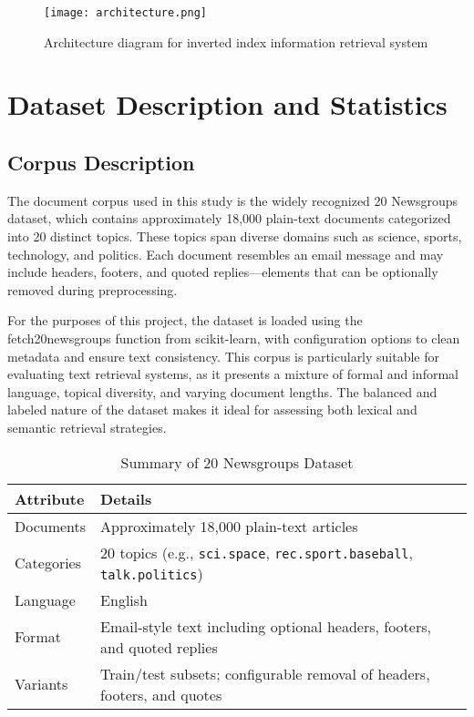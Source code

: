 \documentclass[conference]{IEEEtran}
\begin{document}
\begin{figure}[htbp]
    \centering
    \texttt{[image: architecture.png]} %
    \caption{Architecture diagram for inverted index information retrieval system}
    \label{fig:architecture}
\end{figure}


\section{Dataset Description and Statistics}\label{AA}
\subsection{Corpus Description}
The document corpus used in this study is the widely recognized 20 Newsgroups dataset, which contains approximately 18,000 plain-text documents categorized into 20 distinct topics. These topics span diverse domains such as science, sports, technology, and politics. Each document resembles an email message and may include headers, footers, and quoted replies—elements that can be optionally removed during preprocessing.

For the purposes of this project, the dataset is loaded using the fetch20newsgroups function from scikit-learn, with configuration options to clean metadata and ensure text consistency. This corpus is particularly suitable for evaluating text retrieval systems, as it presents a mixture of formal and informal language, topical diversity, and varying document lengths. The balanced and labeled nature of the dataset makes it ideal for assessing both lexical and semantic retrieval strategies.

\begin{table}[h!]
\centering
\caption{Summary of 20 Newsgroups Dataset}
\begin{tabular}{|p{2.5cm}|p{5.5cm}|}
\hline
\textbf{Attribute} & \textbf{Details} \\
\hline
Documents & Approximately 18{,}000 plain-text articles \\
\hline
Categories & 20 topics (e.g., \texttt{sci.space}, \texttt{rec.sport.baseball}, \texttt{talk.politics}) \\
\hline
Language & English \\
\hline
Format & Email-style text including optional headers, footers, and quoted replies \\
\hline
Variants & Train/test subsets; configurable removal of headers, footers, and quotes \\
\hline
\end{tabular}
\label{tab:20newsgroups}
\end{table}
\end{document}
